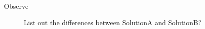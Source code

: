 \documentclass[11pt,a4paper]{article}
\def\AnswerBox{\fbox{\begin{minipage}{4in}\hfill\vspace{0.5in}\end{minipage}}}
\begin{document}
\begin{enumerate}
\begin{description}
\item [Observe] List out the differences between SolutionA and SolutionB?

\AnswerBox

\end{description}
\end{enumerate}
\end{document}
